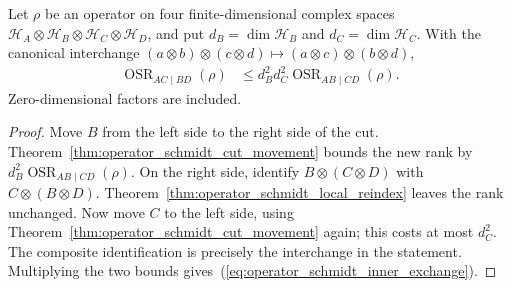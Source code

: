 \begin{theorem}
    \label{thm:operator_schmidt_four_factor_movement}
    \leanok
    Let $\rho$ be an operator on four finite-dimensional complex spaces
    $\mathcal H_A\otimes\mathcal H_B\otimes\mathcal H_C\otimes\mathcal H_D$,
    and put $d_B=\dim\mathcal H_B$ and $d_C=\dim\mathcal H_C$.
    With the canonical interchange
    $(a\otimes b)\otimes(c\otimes d)\mapsto(a\otimes c)\otimes(b\otimes d)$,
    \begin{align}
        \operatorname{OSR}_{AC\mid BD}(\rho)
         & \le d_B^2d_C^2\operatorname{OSR}_{AB\mid CD}(\rho).
        \label{eq:operator_schmidt_inner_exchange}
    \end{align}
    Zero-dimensional factors are included.
\end{theorem}
\begin{proof}\leanok
    Move $B$ from the left side to the right side of the cut. Theorem~\ref{thm:operator_schmidt_cut_movement}
    bounds the new rank by $d_B^2\operatorname{OSR}_{AB\mid CD}(\rho)$.
    On the right side, identify $B\otimes(C\otimes D)$ with
    $C\otimes(B\otimes D)$. Theorem~\ref{thm:operator_schmidt_local_reindex}
    leaves the rank unchanged. Now move $C$ to the left side, using
    Theorem~\ref{thm:operator_schmidt_cut_movement} again; this costs at most
    $d_C^2$. The composite identification is precisely the interchange in
    the statement. Multiplying the two bounds gives~(\ref{eq:operator_schmidt_inner_exchange}).
\end{proof}

